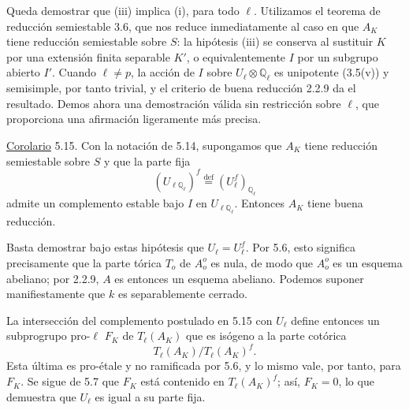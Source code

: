 Queda demostrar que (iii) implica (i), para todo $\ell$. Utilizamos el
teorema de reducción semiestable 3.6, que nos reduce inmediatamente al
caso en que $A_K$ tiene reducción semiestable sobre $S$: la hipótesis
(iii) se conserva al sustituir $K$ por una extensión finita separable
$K'$, o equivalentemente $I$ por un subgrupo abierto $I'$. Cuando
$\ell\neq p$, la acción de $I$ sobre
$U_\ell\otimes\mathbb Q_\ell$ es unipotente (3.5(v)) y semisimple, por
tanto trivial, y el criterio de buena reducción 2.2.9 da el resultado.
Demos ahora una demostración válida sin restricción sobre $\ell$, que
proporciona una afirmación ligeramente más precisa.

\medskip
\noindent
\underline{Corolario} 5.15. Con la notación de 5.14, supongamos que
$A_K$ tiene reducción semiestable sobre $S$ y que la parte fija
\[
 (U_{\ell\mathbb Q_\ell})^f
 \stackrel{\mathrm{def}}{=}(U_\ell^f)_{\mathbb Q_\ell}
\]
admite un complemento estable bajo $I$ en
$U_{\ell\mathbb Q_\ell}$. Entonces $A_K$ tiene buena reducción.

Basta demostrar bajo estas hipótesis que $U_\ell=U_\ell^f$. Por 5.6,
esto significa precisamente que la parte tórica $T_o$ de $A_o^o$ es
nula, de modo que $A_o^o$ es un esquema abeliano; por 2.2.9, $A$ es
entonces un esquema abeliano. Podemos suponer manifiestamente que $k$
es separablemente cerrado.


La intersección del complemento postulado en 5.15 con $U_\ell$ define
entonces un subprogrupo pro-$\ell$ $F_K$ de $T_\ell(A_K)$ que es isógeno
a la parte cotórica
\[
 T_\ell(A_K)/T_\ell(A_K)^f.
\]
Esta última es pro-étale y no ramificada por 5.6, y lo mismo vale, por
tanto, para $F_K$. Se sigue de 5.7 que $F_K$ está contenido en
$T_\ell(A_K)^f$; así, $F_K=0$, lo que demuestra que $U_\ell$ es igual
a su parte fija.

